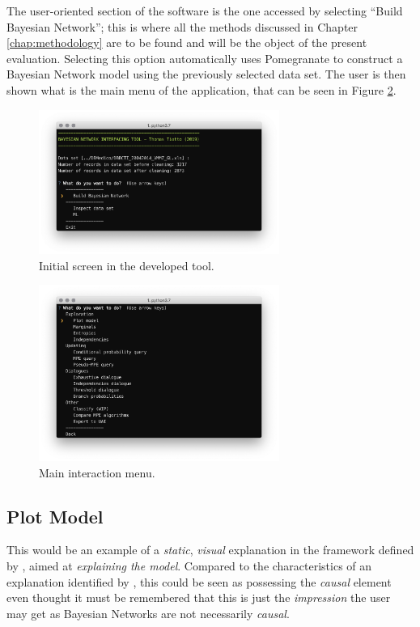 The user-oriented section of the software is the one accessed by selecting \enquote{Build Bayesian Network}; this is where all the methods discussed in Chapter \ref{chap:methodology} are to be found and will be the object of the present evaluation.
Selecting this option automatically uses Pomegranate to construct a Bayesian Network model using the previously selected data set.
The user is then shown what is the main menu of the application, that can be seen in Figure \ref{fig:sw_1}.

\begin{figure}[htbp]
\centerline{\includegraphics[width=0.7\textwidth]{results/images/sw_0}}
\caption{Initial screen in the developed tool.}
\label{fig:sw_0}
\end{figure}

\begin{figure}[htbp]
\centerline{\includegraphics[width=0.7\textwidth]{results/images/sw_1}}
\caption{Main interaction menu.}
\label{fig:sw_1}
\end{figure}

\subsection{Plot Model}
This would be an example of a \textit{static}, \textit{visual} explanation in the framework defined by \citet{lacave2002review}, aimed at \textit{explaining the model}.
Compared to the characteristics of an explanation identified by \citet{miller2018explanation}, this could be seen as possessing the \textit{causal} element even thought it must be remembered that this is just the \textit{impression} the user may get as Bayesian Networks are not necessarily \textit{causal}.

